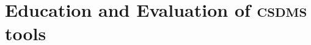 \documentclass[11pt, oneside]{amsart}
\DeclareRobustCommand{\csdms}{\textsc{csdms}}
\begin{document}

\section{Education and Evaluation of \csdms{} tools}
\label{sec:education}


\end{document}
